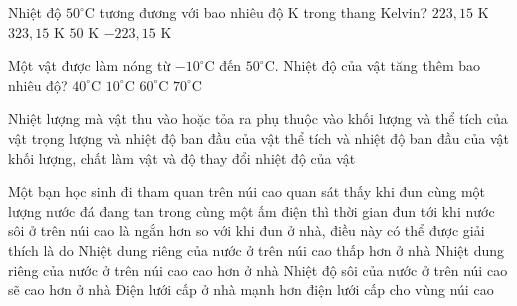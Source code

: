 \begin{ex}
	Nhiệt độ $50^\circ\text{C}$ tương đương với bao nhiêu độ $\text{K}$ trong thang Kelvin?
	\choice
	{$223{,}15\text{ K}$}
	{\True $323{,}15\text{ K}$}
	{$50\text{ K}$}
	{$-223{,}15\text{ K}$}
\end{ex}

\begin{ex}
	Một vật được làm nóng từ $-10^\circ\text{C}$ đến $50^\circ\text{C}$. Nhiệt độ của vật tăng thêm bao nhiêu độ?
	\choice
	{$40^\circ\text{C}$}
	{$10^\circ\text{C}$}
	{\True $60^\circ\text{C}$}
	{$70^\circ\text{C}$}
\end{ex}

\begin{ex}
	Nhiệt lượng mà vật thu vào hoặc tỏa ra phụ thuộc vào
	\choice
	{khối lượng và thể tích của vật}
	{trọng lượng và nhiệt độ ban đầu của vật}
	{thể tích và nhiệt độ ban đầu của vật}
	{\True khối lượng, chất làm vật và độ thay đổi nhiệt độ của vật}
\end{ex}

\begin{ex}
	Một bạn học sinh đi tham quan trên núi cao quan sát thấy khi đun cùng một lượng nước đá đang tan trong cùng một ấm điện thì thời gian đun tới khi nước sôi ở trên núi cao là ngắn hơn so với khi đun ở nhà, điều này có thể được giải thích là do
	\choice
	{\True Nhiệt dung riêng của nước ở trên núi cao thấp hơn ở nhà}
	{Nhiệt dung riêng của nước ở trên núi cao cao hơn ở nhà}
	{Nhiệt độ sôi của nước ở trên núi cao sẽ cao hơn ở nhà}
	{Điện lưới cấp ở nhà mạnh hơn điện lưới cấp cho vùng núi cao}
\end{ex}

